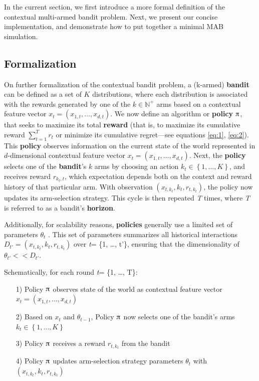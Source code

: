 \documentclass{jss}
\begin{document}
In the current section, we first introduce a more formal definition of the contextual multi-armed bandit problem. Next, we present our concise implementation, and demonstrate how to put together a minimal MAB simulation.

\subsection{Formalization} \label{formalization}

On further formalization of the contextual bandit problem, a (k-armed) \textbf{bandit} can be defined as a set of $K$ distributions, where each distribution is associated with the rewards generated by one of the $k\in \mathbb {N} ^{+}$ arms based on a contextual feature vector \(x_{t}=\left( x_{1,t},  \dots, x_{d,t}\right)\). We now define an algorithm or \textbf{policy} $\piup$, that seeks to maximize its total \textbf{reward} (that is, to maximize its cumulative reward $\sum_{t=1}^T r_t$ or minimize its cumulative regret---see equations \ref{eq:1}, \ref{eq:2}). This \textbf{policy} observes information on the current state of the world represented in $d$-dimensional contextual feature vector \(x_{t}=\left( x_{1,t},  \dots, x_{d,t}\right)\). Next, the \textbf{policy} selects one of the \textbf{bandit}'s $k$ arms by choosing an action \(k_{t} \in \left\{ 1, \dots, K \right\}\), and receives reward \(r_{k_{t},t}\), which expectation depends both on the context and reward history of that particular arm. With observation \( (x_{t,k_t},k_{t},r_{t,k_t}) \), the policy now updates its arm-selection strategy. This cycle is then repeated \textit{T} times, where \textit{T} is referred to as a bandit's \textbf{horizon}.

Additionally, for scalability reasons, \textbf{policies} generally use a limited set of parameters $\theta_{t}$ \citep{Kaptein2016}. This set of parameters summarizes all historical interactions \( D_{t'} = (x_{t,k_t},k_{t},r_{t,k_t}) \) over \emph{t}= \{1, \ldots, t'\}, ensuring that the dimensionality of $\theta_{t'} << D_{t'}$.

Schematically, for each round \emph{t}= \{1, \ldots, T\}:

\begin{enumerate}
         \item[1)] Policy $\piup$ observes state of the world as contextual feature vector \(x_{t}=\left( x_{1,t},  \dots, x_{d,t}\right)\)
         \item[2)] Based on $x_{t}$ and $\theta_{t-1}$, Policy $\piup$ now selects one of the bandit's arms \(k_{t} \in \left\{ 1, \dots, K \right\}\)
         \item[3)] Policy $\piup$ receives a reward \(r_{t,k_t}\) from the bandit
         \item[4)] Policy $\piup$ updates arm-selection strategy parameters $\theta_{t}$ with \( (x_{t,k_t},k_{t},r_{t,k_t}) \)
\end{enumerate}
\end{document}
